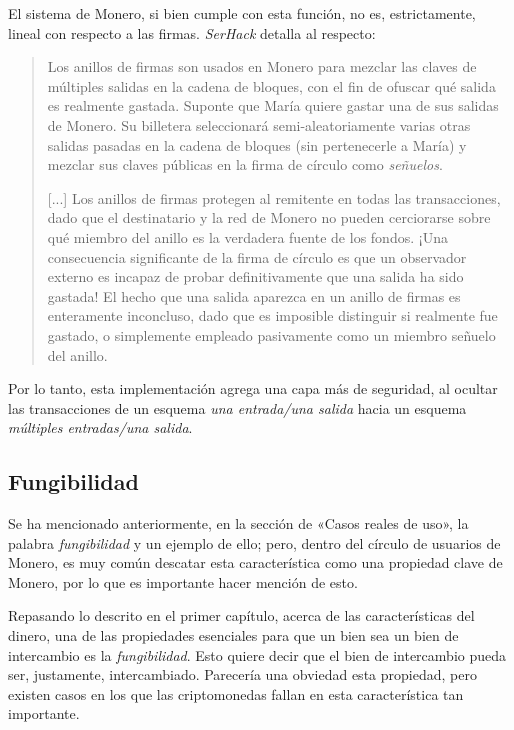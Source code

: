 \documentclass[12pt,a4paper,twoside]{book}
\begin{document}
El sistema de Monero, si bien cumple con esta función, no es, estrictamente, lineal con respecto a las firmas. \textit{SerHack} detalla al respecto:

\begin{quotation}
Los anillos de firmas son usados en Monero para mezclar las claves de múltiples salidas en la cadena de bloques, con el fin de ofuscar qué salida es realmente gastada. Suponte que María quiere gastar una de sus salidas de Monero. Su billetera seleccionará semi-aleatoriamente varias otras salidas pasadas en la cadena de bloques (sin pertenecerle a María) y mezclar sus claves públicas en la firma de círculo como \textit{señuelos}.

[...] Los anillos de firmas protegen al remitente en todas las transacciones, dado que el destinatario y la red de Monero no pueden cerciorarse sobre qué miembro del anillo es la verdadera fuente de los fondos. ¡Una consecuencia significante de la firma de círculo es que un observador externo es incapaz de probar definitivamente que una salida ha sido gastada! El hecho que una salida aparezca en un anillo de firmas es enteramente inconcluso, dado que es imposible distinguir si realmente fue gastado, o simplemente empleado pasivamente como un miembro señuelo del anillo. \cite[págs. 68]{monero:master}
\end{quotation}

Por lo tanto, esta implementación agrega una capa más de seguridad, al ocultar las transacciones de un esquema \textit{una entrada/una salida} hacia un esquema \textit{múltiples entradas/una salida}.

\subsection{Fungibilidad}
Se ha mencionado anteriormente, en la sección de «Casos reales de uso», la palabra \textit{fungibilidad} y un ejemplo de ello; pero, dentro del círculo de usuarios de Monero, es muy común descatar esta característica como una propiedad clave de Monero, por lo que es importante hacer mención de esto.

Repasando lo descrito en el primer capítulo, acerca de las características del dinero, una de las propiedades esenciales para que un bien sea un bien de intercambio es la \textit{fungibilidad}. Esto quiere decir que el bien de intercambio pueda ser, justamente, intercambiado. Parecería una obviedad esta propiedad, pero existen casos en los que las criptomonedas fallan en esta característica tan importante.
\end{document}
